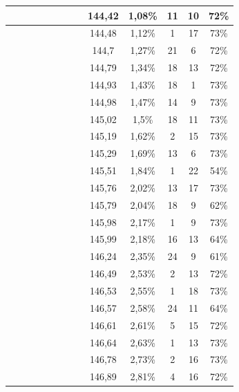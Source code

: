 \begin{center}
\begin{longtable}{|c|c|c|c|c|c|c|c|c|c|c|c|c|}
 \x &  &  \x &  &  \x &  \x &  &  \x & 144,42 & 1,08\% & 11 & 10 & 72\% \\ \hline
 \x &  \x &  &  \x &  \x &  \x &  &  \x & 144,48 & 1,12\% & 1 & 17 & 73\% \\ \hline
 \x &  &  \x &  \x &  &  \x &  &  \x & 144,7 & 1,27\% & 21 & 6 & 72\% \\ \hline
 \x &  \x &  \x &  \x &  &  \x &  &  \x & 144,79 & 1,34\% & 18 & 13 & 72\% \\ \hline
 \x &  &  &  &  &  \x &  &  \x & 144,93 & 1,43\% & 18 & 1 & 73\% \\ \hline
 \x &  &  \x &  \x &  \x &  \x &  \x &  \x & 144,98 & 1,47\% & 14 & 9 & 73\% \\ \hline
 \x &  &  \x &  \x &  &  \x &  \x &  \x & 145,02 & 1,5\% & 18 & 11 & 73\% \\ \hline
 \x &  \x &  \x &  \x &  &  \x &  \x &  \x & 145,19 & 1,62\% & 2 & 15 & 73\% \\ \hline
 \x &  &  &  \x &  &  \x &  \x &  \x & 145,29 & 1,69\% & 13 & 6 & 73\% \\ \hline
 \x &  \x &  &  &  &  &  &  \x & 145,51 & 1,84\% & 1 & 22 & 54\% \\ \hline
 \x &  &  \x &  &  \x &  \x &  &  \x & 145,76 & 2,02\% & 13 & 17 & 73\% \\ \hline
 \x &  \x &  \x &  &  \x &  &  &  \x & 145,79 & 2,04\% & 18 & 9 & 62\% \\ \hline
 \x &  \x &  \x &  &  \x &  \x &  \x &  \x & 145,98 & 2,17\% & 1 & 9 & 73\% \\ \hline
 \x &  &  \x &  &  &  &  &  \x & 145,99 & 2,18\% & 16 & 13 & 64\% \\ \hline
 \x &  &  &  &  \x &  &  &  \x & 146,24 & 2,35\% & 24 & 9 & 61\% \\ \hline
 \x &  \x &  \x &  &  \x &  \x &  &  \x & 146,49 & 2,53\% & 2 & 13 & 72\% \\ \hline
 \x &  &  \x &  &  &  \x &  &  \x & 146,53 & 2,55\% & 1 & 18 & 73\% \\ \hline
 \x &  \x &  \x &  &  &  &  &  \x & 146,57 & 2,58\% & 24 & 11 & 64\% \\ \hline
 \x &  \x &  \x &  &  \x &  \x &  \x &  \x & 146,61 & 2,61\% & 5 & 15 & 72\% \\ \hline
 \x &  \x &  &  \x &  \x &  \x &  \x &  \x & 146,64 & 2,63\% & 1 & 13 & 73\% \\ \hline
 \x &  \x &  \x &  \x &  \x &  \x &  \x &  \x & 146,78 & 2,73\% & 2 & 16 & 73\% \\ \hline
 \x &  \x &  \x &  \x &  \x &  \x &  \x &  \x & 146,89 & 2,81\% & 4 & 16 & 72\% \\ \hline

\end{longtable}
\end{center}
